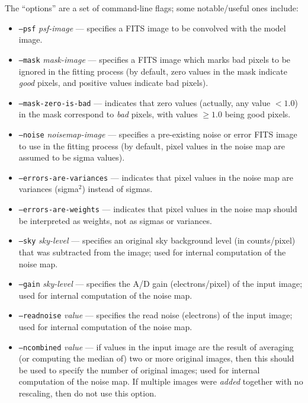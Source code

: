 \documentclass[10pt]{article}
\begin{document}
The ``options'' are a set of command-line flags; some notable/useful ones
include:
\begin{itemize}
\item \texttt{--psf} \textit{psf-image} --- specifies a FITS image to be convolved
with the model image.

\bigskip

\item \texttt{--mask} \textit{mask-image} --- specifies a FITS image which marks
bad pixels to be ignored in the fitting process (by default, zero values in
the mask indicate \textit{good} pixels, and positive values indicate bad pixels).
\item \texttt{--mask-zero-is-bad} --- indicates that zero values (actually,
any value $< 1.0$) in the mask correspond to \textit{bad} pixels, with values
$\geq 1.0$ being good pixels.

\bigskip

\item \texttt{--noise} \textit{noisemap-image} --- specifies a pre-existing noise
or error FITS image to use in the fitting process (by default, pixel values in the
noise map are assumed to be sigma values).
\item \texttt{--errors-are-variances} --- indicates that pixel values in the noise
map are variances (sigma$^2$) instead of sigmas.
\item \texttt{--errors-are-weights} --- indicates that pixel values in the noise
map should be interpreted as weights, not as sigmas or variances.

\bigskip

\item \texttt{--sky} \textit{sky-level} --- specifies an original sky background
level (in counts/pixel) that was subtracted from the image; used for internal
computation of the noise map.
\item \texttt{--gain} \textit{sky-level} --- specifies the A/D gain (electrons/pixel)
of the input image; used for internal computation of the noise map.
\item \texttt{--readnoise} \textit{value} --- specifies the read noise (electrons)
of the input image; used for internal computation of the noise map.
\item \texttt{--ncombined} \textit{value} --- if values in the input image are the
result of averaging (or computing the median of) two or more original images, then
this should be used to specify the number of original images; used for internal 
computation of the noise map.  If multiple images were \textit{added} together
with no rescaling, then do not use this option.


\end{itemize}
\end{document}
